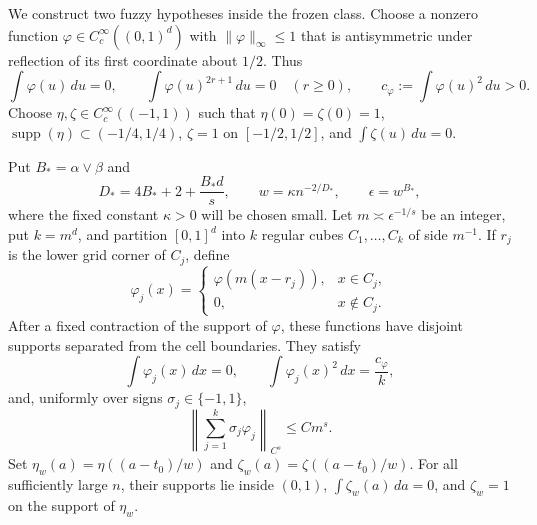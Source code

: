 We construct two fuzzy hypotheses inside the frozen class. Choose a nonzero function \(\varphi\in C_c^\infty((0,1)^d)\) with \(\lVert\varphi\rVert_\infty\le1\) that is antisymmetric under reflection of its first coordinate about \(1/2\). Thus
\[
\int\varphi(u)\,du=0,
\qquad
\int\varphi(u)^{2r+1}\,du=0\quad(r\ge0),
\qquad
c_\varphi:=\int\varphi(u)^2\,du>0.
\]
Choose \(\eta,\zeta\in C_c^\infty((-1,1))\) such that \(\eta(0)=\zeta(0)=1\), \(\operatorname{supp}(\eta)\subset(-1/4,1/4)\), \(\zeta=1\) on \([-1/2,1/2]\), and \(\int\zeta(u)\,du=0\).

Put \(B_*=\alpha\vee\beta\) and
\[
D_*=4B_*+2+\frac{B_*d}{s},
\qquad
w=\kappa n^{-2/D_*},
\qquad
\epsilon=w^{B_*},
\]
where the fixed constant \(\kappa>0\) will be chosen small. Let \(m\asymp\epsilon^{-1/s}\) be an integer, put \(k=m^d\), and partition \([0,1]^d\) into \(k\) regular cubes \(C_1,\ldots,C_k\) of side \(m^{-1}\). If \(r_j\) is the lower grid corner of \(C_j\), define
\[
\varphi_j(x)=
\begin{cases}
\varphi(m(x-r_j)),&x\in C_j,\\
0,&x\notin C_j.
\end{cases}
\]
After a fixed contraction of the support of \(\varphi\), these functions have disjoint supports separated from the cell boundaries. They satisfy
\[
\int\varphi_j(x)\,dx=0,
\qquad
\int\varphi_j(x)^2\,dx=\frac{c_\varphi}{k},
\]
and, uniformly over signs \(\sigma_j\in\{-1,1\}\),
\[
\left\lVert\sum_{j=1}^k\sigma_j\varphi_j\right\rVert_{C^s}
\le C m^s.
\]
Set \(\eta_w(a)=\eta((a-t_0)/w)\) and \(\zeta_w(a)=\zeta((a-t_0)/w)\). For all sufficiently large \(n\), their supports lie inside \((0,1)\), \(\int\zeta_w(a)\,da=0\), and \(\zeta_w=1\) on the support of \(\eta_w\).


